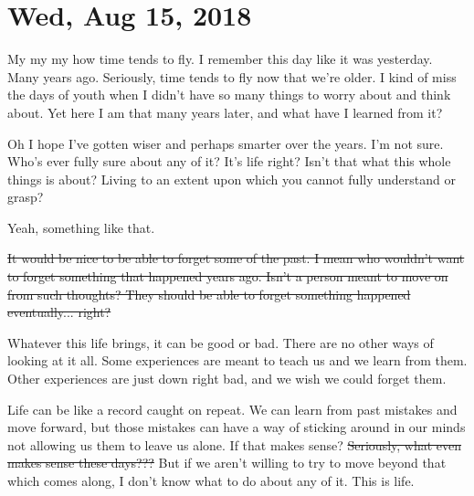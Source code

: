 \section{Wed, Aug 15, 2018}

My my my how time tends to fly. I remember this day like it was yesterday. Many years
ago. Seriously, time tends to fly now that we're older. I kind of miss the days of
youth when I didn't have so many things to worry about and think about. Yet here I am
that many years later, and what have I learned from it?

Oh I hope I've gotten wiser and perhaps smarter over the years. I'm not sure. Who's
ever fully sure about any of it? It's life right? Isn't that what this whole things
is about? Living to an extent upon which you cannot fully understand or grasp?

Yeah, something like that.

\st{It would be nice to be able to forget some of the past. I mean who wouldn't want 
to forget something that happened years ago. Isn't a person meant to move on from
such thoughts? They should be able to forget something happened eventually... right?}

Whatever this life brings, it can be good or bad. There are no other ways of looking
at it all. Some experiences are meant to teach us and we learn from them. Other
experiences are just down right bad, and we wish we could forget them.

Life can be like a record caught on repeat. We can learn from past mistakes and move
forward, but those mistakes can have a way of sticking around in our minds not
allowing us them to leave us alone. If that makes sense? \st{Seriously, what even 
makes sense these days???} But if we aren't willing to try to move beyond that which
comes along, I don't know what to do about any of it. This is life.
